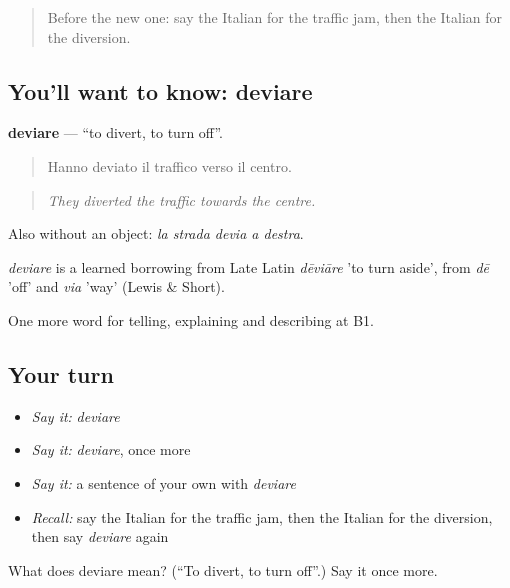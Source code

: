 \label{lesson:IT-C413-deviare}



\begin{quote}
Before the new one: say the Italian for the traffic jam, then the Italian for the diversion.
\end{quote}

\subsection*{You'll want to know: deviare}
\textbf{deviare} — \textquotedblleft{}to divert, to turn off\textquotedblright{}.

\begin{quote}
Hanno deviato il traffico verso il centro.
\end{quote}

\begin{quote}
\emph{They diverted the traffic towards the centre.}
\end{quote}

Also without an object: \emph{la strada devia a destra}.

\begin{cousinweb}
\emph{deviare} is a learned borrowing from Late Latin \emph{dēviāre} 'to turn aside', from \emph{dē} 'off' and \emph{via} 'way' (Lewis \& Short).
\end{cousinweb}

\begin{grammarlens}[title={What you've built}]
One more word for telling, explaining and describing at B1.
\end{grammarlens}

\subsection*{Your turn}
\begin{itemize}
\raggedright
  \item \emph{Say it:} \emph{deviare}
  \item \emph{Say it:} \emph{deviare}, once more
  \item \emph{Say it:} a sentence of your own with \emph{deviare}
  \item \emph{Recall:} say the Italian for the traffic jam, then the Italian for the diversion, then say \emph{deviare} again
\end{itemize}

\begin{tcolorbox}[breakable,colback=teal!4,colframe=teal!35!black,title={Before you move on}]
What does deviare mean? (\textquotedblleft{}To divert, to turn off\textquotedblright{}.) Say it once more.
\end{tcolorbox}
